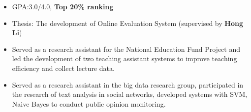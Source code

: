 \documentclass{resume_en}
\begin{document}
\begin{itemize}
    \item GPA:3.0/4.0, \textbf{Top 20\% ranking}
    \item Thesis: The development of Online Evaluation System (supervised by \textbf{Hong Li})
    \item Served as a research assistant for the National Education Fund Project and led the development of two teaching assistant systems to improve teaching efficiency and collect lecture data.
    \item Served as a research assistant in the big data research group, participated in the research of text analysis in social networks, developed systems with SVM, Naive Bayes to conduct public opinion monitoring.
\end{itemize}


\end{document}
